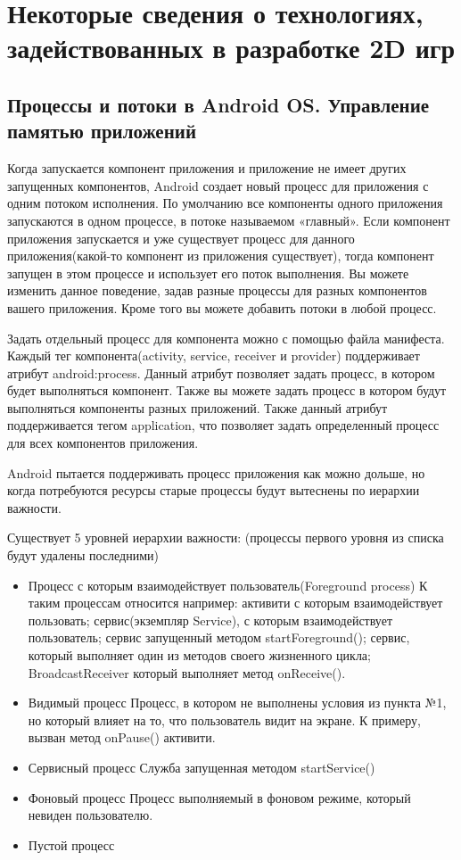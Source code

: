\chapter{Некоторые сведения о технологиях, задействованных в разработке 2D игр}
\section{Процессы и потоки в Android OS. Управление памятью приложений}

Когда запускается компонент приложения и приложение не имеет других запущенных компонентов, Android создает новый процесс для приложения с одним потоком исполнения. По умолчанию все компоненты одного приложения запускаются в одном процессе, в потоке называемом «главный». Если компонент приложения запускается и уже существует процесс для данного приложения(какой-то компонент из приложения существует), тогда компонент запущен в этом процессе и использует его поток выполнения. Вы можете изменить данное поведение, задав разные процессы для разных компонентов вашего приложения. Кроме того вы можете добавить потоки в любой процесс.

Задать отдельный процесс для компонента можно с помощью файла манифеста. Каждый тег компонента(activity, service, receiver и provider) поддерживает атрибут android:process. Данный атрибут позволяет задать процесс, в котором будет выполняться компонент. Также вы можете задать процесс в котором будут выполняться компоненты разных приложений. Также данный атрибут поддерживается тегом application, что позволяет задать определенный процесс для всех компонентов приложения.

Android пытается поддерживать процесс приложения как можно дольше, но когда потребуются ресурсы старые процессы будут вытеснены по иерархии важности.

Существует 5 уровней иерархии важности: (процессы первого уровня из списка будут удалены последними)

\begin{itemize}
\item Процесс с которым взаимодействует пользователь(Foreground process)
К таким процессам относится например: активити с которым взаимодействует пользовать; сервис(экземпляр Service), с которым взаимодействует пользователь; сервис запущенный методом startForeground(); сервис, который выполняет один из методов своего жизненного цикла; BroadcastReceiver который выполняет метод onReceive().

\item Видимый процесс
Процесс, в котором не выполнены условия из пункта №1, но который влияет на то, что пользователь видит на экране. К примеру, вызван метод onPause() активити.

\item Сервисный процесс
Служба запущенная методом startService()

\item Фоновый процесс
Процесс выполняемый в фоновом режиме, который невиден пользователю.

\item Пустой процесс

\end{itemize}

